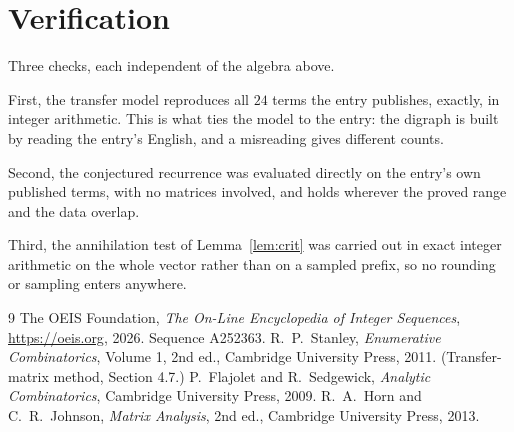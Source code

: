\documentclass[11pt,a4paper]{article}
\theoremstyle{plain}
\theoremstyle{definition}
\begin{document}
\section{Verification}

Three checks, each independent of the algebra above.

First, the transfer model reproduces all $24$ terms the entry publishes, exactly, in
integer arithmetic. This is what ties the model to the entry: the digraph is built by reading
the entry's English, and a misreading gives different counts.

Second, the conjectured recurrence was evaluated directly on the entry's own published terms,
with no matrices involved, and holds wherever the proved range and the data overlap.

Third, the annihilation test of Lemma~\ref{lem:crit} was carried out in exact integer
arithmetic on the whole vector rather than on a sampled prefix, so no rounding or sampling
enters anywhere.

\begin{thebibliography}{9}
 The OEIS Foundation, \emph{The On-Line Encyclopedia of Integer
Sequences}, \url{https://oeis.org}, 2026. Sequence A252363.
 R.~P.~Stanley, \emph{Enumerative Combinatorics}, Volume 1, 2nd ed.,
Cambridge University Press, 2011. (Transfer-matrix method, Section 4.7.)
 P.~Flajolet and R.~Sedgewick, \emph{Analytic Combinatorics}, Cambridge
University Press, 2009.
 R.~A.~Horn and C.~R.~Johnson, \emph{Matrix Analysis}, 2nd ed., Cambridge
University Press, 2013.
\end{thebibliography}
\end{document}

